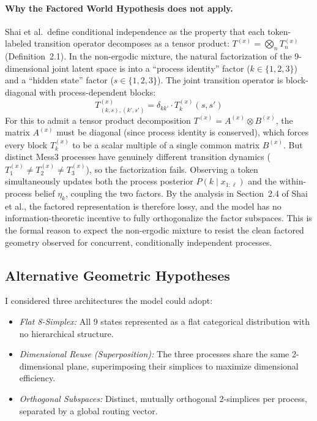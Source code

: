\documentclass[11pt]{article}
\begin{document}
\paragraph{Why the Factored World Hypothesis does not apply.}
Shai et al.\ define conditional independence as the property that each token-labeled transition operator decomposes as a tensor product: $T^{(x)} = \bigotimes_n T_n^{(x)}$ (Definition~2.1). In the non-ergodic mixture, the natural factorization of the 9-dimensional joint latent space is into a ``process identity'' factor ($k \in \{1,2,3\}$) and a ``hidden state'' factor ($s \in \{1,2,3\}$). The joint transition operator is block-diagonal with process-dependent blocks:
\begin{equation}
    T^{(x)}_{(k,s),(k',s')} = \delta_{kk'} \cdot T_k^{(x)}(s, s')
\end{equation}
For this to admit a tensor product decomposition $T^{(x)} = A^{(x)} \otimes B^{(x)}$, the matrix $A^{(x)}$ must be diagonal (since process identity is conserved), which forces every block $T_k^{(x)}$ to be a scalar multiple of a single common matrix $B^{(x)}$. But distinct Mess3 processes have genuinely different transition dynamics ($T_1^{(x)} \neq T_2^{(x)} \neq T_3^{(x)}$), so the factorization fails. Observing a token simultaneously updates both the process posterior $P(k \mid x_{1:\ell})$ and the within-process belief $\eta_k$, coupling the two factors. By the analysis in Section~2.4 of Shai et al., the factored representation is therefore lossy, and the model has no information-theoretic incentive to fully orthogonalize the factor subspaces. This is the formal reason to expect the non-ergodic mixture to resist the clean factored geometry observed for concurrent, conditionally independent processes.

\subsection{Alternative Geometric Hypotheses}
I considered three architectures the model could adopt:
\begin{itemize}
    \item \textit{Flat 8-Simplex:} All 9 states represented as a flat categorical distribution with no hierarchical structure.
    \item \textit{Dimensional Reuse (Superposition):} The three processes share the same 2-dimensional plane, superimposing their simplices to maximize dimensional efficiency.
    \item \textit{Orthogonal Subspaces:} Distinct, mutually orthogonal 2-simplices per process, separated by a global routing vector.
\end{itemize}
\end{document}
